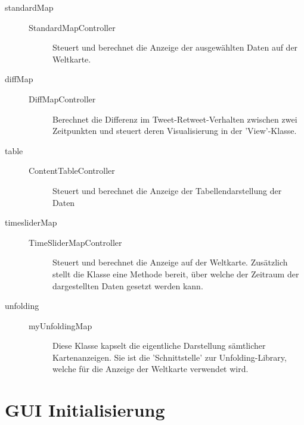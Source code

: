 \begin{description}
    \item[standardMap] \quad
	    \begin{description}
	    	\item [StandardMapController] Steuert und berechnet die Anzeige der ausgewählten Daten auf der Weltkarte.
	    \end{description}
	\item[diffMap] \quad
		\begin{description}
			\item [DiffMapController] Berechnet die Differenz im Tweet-Retweet-Verhalten zwischen zwei Zeitpunkten und steuert deren Visualisierung in der 'View'-Klasse.
		\end{description}
    \item[table] \quad
	    \begin{description}
	    	\item [ContentTableController] Steuert und berechnet die Anzeige der Tabellendarstellung der Daten
	    \end{description}
    \item[timesliderMap] \quad
	    \begin{description}
	    	\item [TimeSliderMapController] Steuert und berechnet die Anzeige auf der Weltkarte. Zusätzlich stellt die Klasse eine Methode bereit, über welche der Zeitraum der dargestellten Daten gesetzt werden kann.
	    \end{description}
	\item[unfolding] \quad
		\begin{description}
			\item [myUnfoldingMap] Diese Klasse kapselt die eigentliche Darstellung sämtlicher Kartenanzeigen. Sie ist die 'Schnittstelle' zur Unfolding-Library, welche für die Anzeige der Weltkarte verwendet wird.
		\end{description}
	
\end{description}
\section{GUI Initialisierung}

